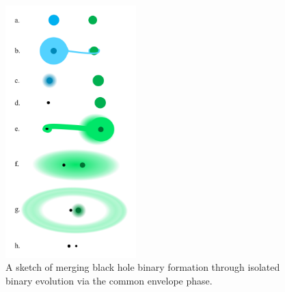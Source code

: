 \documentclass[iop,onecolumn]{revtex4}
\begin{document}
\begin{figure}
	\centering
	\includegraphics[width=0.45\textwidth]{channel1.png}
	\caption{\label{fig:isol_binary} A sketch of merging black hole binary formation through isolated binary evolution via the common envelope phase.}
\end{figure}
\end{document}
